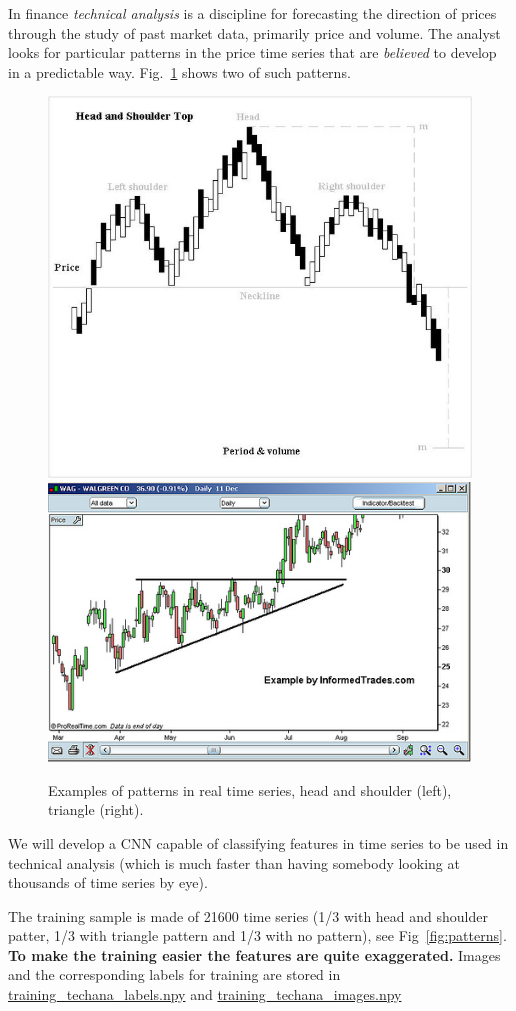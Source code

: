 In finance \emph{technical analysis} is a discipline for forecasting the direction of prices through the study of past market data, primarily price and volume. The analyst looks for particular patterns in the price time series that are \emph{believed} to develop in a predictable way. Fig.~\ref{fig:tech_ana} shows two of such patterns.

\begin{figure}[htb]
\centering
\includegraphics[width=0.4\linewidth]{figures/H_and_s_top_new.jpg}\qquad
\includegraphics[width=0.4\linewidth]{figures/Triangle-ascending.jpg}
\caption{Examples of patterns in real time series, head and shoulder (left), triangle (right).}
\label{fig:tech_ana}
\end{figure}

We will develop a CNN capable of classifying features in time series to be used in technical analysis (which is much faster than having somebody looking at thousands of time series by eye).

The training sample is made of 21600 time series (1/3 with head and shoulder patter, 1/3 with triangle pattern and 1/3 with no pattern), see Fig~\ref{fig:patterns}. \textbf{To make the training easier the features are quite exaggerated.}
Images and the corresponding labels for training are stored in \href{https://drive.google.com/file/d/1lx8l6MQCfBtzjdVK-qvwDxzP3Eh5eONR/view?usp=sharing}{training\_techana\_labels.npy} and
\href{https://drive.google.com/file/d/1Vt4XJfDu6FiPGAKuEu-2m4MMCgBjY_eN/view?usp=sharing}{training\_techana\_images.npy}

